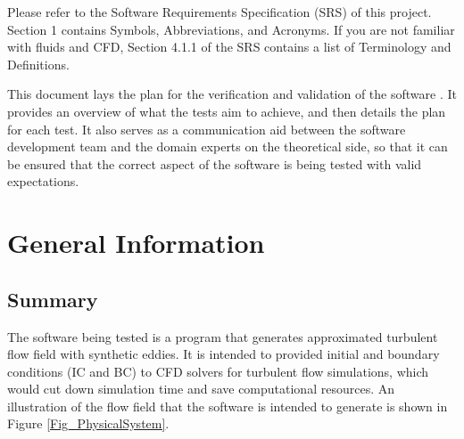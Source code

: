 \documentclass[12pt, titlepage]{article}
\begin{document}
Please refer to the Software Requirements Specification (SRS) \citet{SRS} of this project. Section 1 contains Symbols, Abbreviations, and Acronyms. If you are not familiar with fluids and CFD, Section 4.1.1 of the SRS contains a list of Terminology and Definitions.



\newpage


This document lays the plan for the verification and validation of the software \progname{}. It provides an overview of what the tests aim to achieve, and then details the plan for each test. It also serves as a communication aid between the software development team and the domain experts on the theoretical side, so that it can be ensured that the correct aspect of the software is being tested with valid expectations.

\section{General Information}

\subsection{Summary}

The software being tested is a program that generates approximated turbulent flow field with synthetic eddies. It is intended to provided initial and boundary conditions (IC and BC) to CFD solvers for turbulent flow simulations, which would cut down simulation time and save computational resources. An illustration of the flow field that the software is intended to generate is shown in Figure \ref{Fig_PhysicalSystem}.
\end{document}

